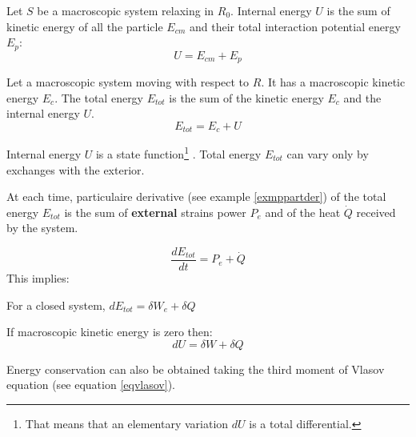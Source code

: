 \documentclass[12pt]{book}
\begin{document}
\begin{defn}
Let $S$ be a macroscopic system relaxing in $R_0$. Internal energy $U$ is the
sum of kinetic energy of all the particle $E_{cm}$ and their total interaction
potential energy $E_p$:
\begin{equation}
U=E_{cm}+E_p
\end{equation}
\end{defn}
\begin{defn}
Let a macroscopic system moving with respect to $R$. It has a macroscopic
kinetic energy $E_c$. The total energy $E_{tot}$ is the sum of the kinetic
energy $E_c$ and the internal energy $U$.
\begin{equation}
E_{tot}=E_c+U
\end{equation}
\end{defn}
\begin{prin}
Internal energy $U$ is a state function\footnote{%
That means that an elementary variation $dU$ is a total differential.
}%
. Total energy
$E_{tot}$ can vary only by exchanges with the exterior.
\end{prin}
\begin{prin}
At each time, particulaire derivative (see example \ref{exmppartder}) of the
total energy $E_{tot}$ is the sum of {\bf external} strains power $P_e$ and of
the heat $\dot Q$
received by the system.
\end{prin}
\begin{equation}
\frac{dE_{tot}}{dt}=P_e+\dot Q
\end{equation}
This implies:
\begin{thm}
For a closed system, $dE_{tot}=\delta W_{e}+\delta Q$
\end{thm}
\begin{thm}
If macroscopic kinetic energy is zero then:
\begin{equation}
dU=\delta W+\delta Q
\end{equation}
\end{thm}
\begin{rem}
Energy conservation can also be obtained taking the third moment of Vlasov
equation (see equation \ref{eqvlasov}).
\end{rem}
\end{document}
